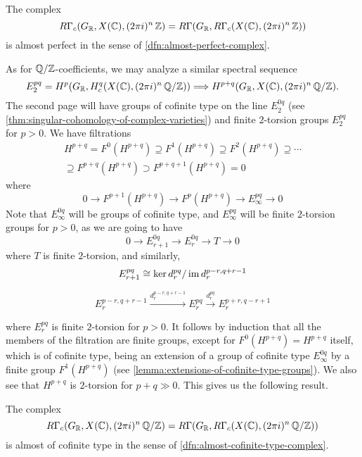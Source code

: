 \begin{lemma}
  \label{lemma:RGammac-GR-XC-Z-almost-perfect}
  The complex
  \[ R\Gamma_c (G_{\mathbb{R}}, X (\mathbb{C}), (2\pi i)^n\,\mathbb{Z}) =
    R\Gamma (G_{\mathbb{R}}, R\Gamma_c (X (\mathbb{C}), (2\pi i)^n\,\mathbb{Z})) \]
    is almost perfect in the sense of \ref{dfn:almost-perfect-complex}.
\end{lemma}

As for $\mathbb{Q}/\mathbb{Z}$-coefficients, we may analyze a similar spectral sequence
\[ E_2^{pq} = H^p (G_{\mathbb{R}}, H^q_c (X (\mathbb{C}), (2\pi i)^n\,\mathbb{Q}/\mathbb{Z})) \Longrightarrow
  H^{p+q} (G_{\mathbb{R}}, X (\mathbb{C}), (2\pi i)^n\,\mathbb{Q}/\mathbb{Z}). \]
The second page will have groups of cofinite type on the line $E_2^{0q}$
(see \ref{thm:singular-cohomology-of-complex-varieties}) and finite $2$-torsion
groups $E_2^{pq}$ for $p > 0$. We have filtrations
\begin{multline}
  \label{eqn:ss-filtrations}
  H^{p+q} = F^0 (H^{p+q}) \supseteq
  F^1 (H^{p+q}) \supseteq
  F^2 (H^{p+q}) \supseteq \cdots\\
  \supseteq F^{p+q} (H^{p+q}) \supset F^{p+q+1} (H^{p+q}) = 0
\end{multline}
where
$$0 \to F^{p+1} (H^{p+q}) \to F^p (H^{p+q}) \to E_\infty^{pq} \to 0$$
Note that $E^{0q}_\infty$ will be groups of cofinite type, and $E^{pq}_\infty$
will be finite $2$-torsion groups for $p > 0$, as we are going to have
$$0 \to E_{r+1}^{0q} \to E_r^{0q} \to T \to 0$$
where $T$ is finite $2$-torsion, and similarly,
$$E_{r+1}^{pq} \cong \ker d_r^{pq} / \operatorname{im} d_r^{p-r,q+r-1}$$

\[ E_r^{p-r,q+r-1} \xrightarrow{d_r^{p-r,q+r-1}}
  E_r^{pq} \xrightarrow{d_r^{pq}}
  E_r^{p+r,q-r+1} \]

\noindent where $E_r^{pq}$ is finite $2$-torsion for $p > 0$. It follows by
induction that all the members of the filtration  are
finite groups, except for $F^0 (H^{p+q}) = H^{p+q}$ itself, which is of cofinite
type, being an extension of a group of cofinite type $E_\infty^{0q}$ by a finite
group $F^1 (H^{p+q})$ (see \ref{lemma:extensions-of-cofinite-type-groups}).
We also see that $H^{p+q}$ is $2$-torsion for $p+q \gg 0$. This gives us the
following result.

\begin{lemma}
  \label{lemma:RGammac-GR-XC-QZ-almost-cofinite-type}
  The complex
  \[ R\Gamma_c (G_{\mathbb{R}}, X (\mathbb{C}), (2\pi i)^n\,\mathbb{Q}/\mathbb{Z}) =
    R\Gamma (G_{\mathbb{R}}, R\Gamma_c (X (\mathbb{C}), (2\pi i)^n\,\mathbb{Q}/\mathbb{Z})) \]
  is almost of cofinite type in the sense of
  \ref{dfn:almost-cofinite-type-complex}.
\end{lemma}

